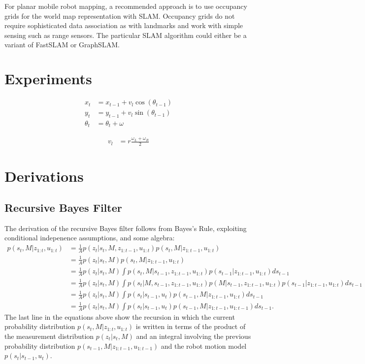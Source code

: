 \documentclass{article}
\begin{document}
For planar mobile robot mapping, a recommended approach is to use occupancy grids for the world map representation with SLAM.  Occupancy grids do not require sophisticated data association as with landmarks and work with simple sensing such as range sensors.  The particular SLAM algorithm could either be a variant of FastSLAM or GraphSLAM.

\section{Experiments}

\begin{align}
x_t &= x_{t-1} + v_l \cos (\theta_{t-1}) \\
y_t &= y_{t-1} + v_l \sin (\theta_{t-1}) \\
\theta_t &= \theta_t + \omega
\end{align}

\begin{align}
v_l &= r \frac{\omega_L + \omega_R}{2}
\end{align}

\appendix

\section{Derivations}

\subsection{Recursive Bayes Filter}

The derivation of the recursive Bayes filter follows from Bayes's Rule, exploiting conditional indepenence assumptions, and some algebra:
\begin{align}
p(s_t, M | z_{1:t}, u_{1:t})  &=  \frac{1}{A} p(z_t | s_t, M, z_{1:t-1}, u_{1:t}) p(s_t, M | z_{1:t-1}, u_{1:t}) \\
&=  \frac{1}{A} p(z_t | s_t, M) p(s_t, M | z_{1:t-1}, u_{1:t}) \\
&=  \frac{1}{A} p(z_t | s_t, M) \int p(s_t, M | s_{t-1}, z_{1:t-1}, u_{1:t}) p(s_{t-1} | z_{1:t-1}, u_{1:t}) ds_{t-1} \\
&=  \frac{1}{A} p(z_t | s_t, M) \int p(s_t | M, s_{t-1}, z_{1:t-1}, u_{1:t}) p(M | s_{t-1}, z_{1:t-1}, u_{1:t}) p(s_{t-1} | z_{1:t-1}, u_{1:t}) ds_{t-1} \\
&=  \frac{1}{A} p(z_t | s_t, M) \int p(s_t | s_{t-1}, u_t) p(s_{t-1}, M | z_{1:t-1}, u_{1:t}) ds_{t-1} \\
&=  \frac{1}{A} p(z_t | s_t, M) \int p(s_t | s_{t-1}, u_t) p(s_{t-1}, M | z_{1:t-1}, u_{1:t-1}) ds_{t-1}.
\end{align}
The last line in the equations above show the recursion in which the current probability distribution $p(s_t, M | z_{1:t}, u_{1:t})$ is written in terms of the product of the measurement distribution $p(z_t | s_t, M)$ and an integral involving the previous probability distribution $p(s_{t-1}, M | z_{1:t-1}, u_{1:t-1})$ and the robot motion model $p(s_t | s_{t-1}, u_t)$.
\end{document}
